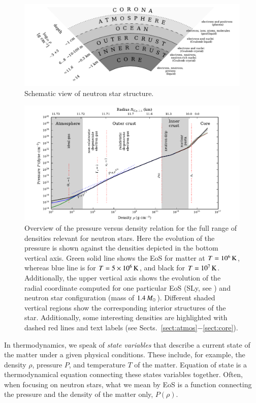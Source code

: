 \begin{figure}[ht]
\centering
\includegraphics[width=16cm]{figs/slice/atmos.pdf}
\caption{
Schematic view of neutron star structure.
}
\end{figure}


\begin{figure}[ht]
\centering
\includegraphics[width=16cm]{notes/eos/eos.pdf}
\caption{\label{fig:eos}
Overview of the pressure versus density relation for the full range of densities relevant for neutron stars.
Here the evolution of the pressure is shown against the densities depicted in the bottom vertical axis.
Green solid line shows the EoS for matter at $T=10^6\, \mathrm{K}$, whereas blue line is for $T=5 \times 10^{6}\, \mathrm{K}$, and black for $T=10^7 \, \mathrm{K}$.
Additionally, the upper vertical axis shows the evolution of the radial coordinate computed for one particular EoS (SLy, see ) and neutron star configuration (mass of $1.4\, M_{\odot}$).
Different shaded vertical regions show the corresponding interior structures of the star.
Additionally, some interesting densities are highlighted with dashed red lines and text labels (see Sects.~\ref{sect:atmos}$-$\ref{sect:core}).
}
\end{figure}


In thermodynamics, we speak of \emph{state variables} that describe a current state of the matter under a given physical conditions.
These include, for example, the density $\rho$, pressure $P$, and temperature $T$ of the matter.
Equation of state is a thermodynamical equation connecting these states variables together.
Often, when focusing on neutron stars, what we mean by EoS is a function connecting the pressure and the density of the matter only, $P(\rho)$.

